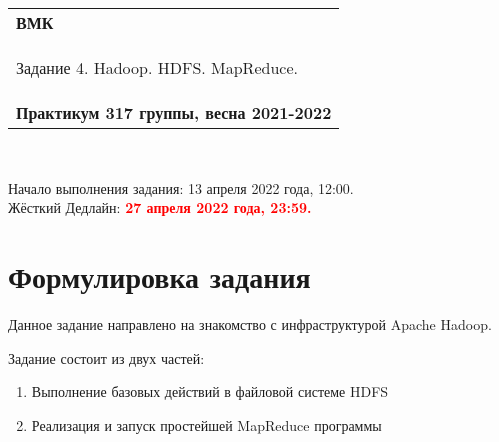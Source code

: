 \documentclass[10pt,fleqn]{article}
\begin{document}
\begin{center}
    \begin{tabular}{|p{17.5cm}|}
        \hline
        \textbf{ВМК}\\
        \begin{center} \Large Задание 4. Hadoop. HDFS. MapReduce. \end{center}\\
        \textbf{Практикум 317 группы, весна 2021-2022}\\
        \hline
    \end{tabular}
\end{center}

\

\begin{tabbing}
    Начало выполнения задания: 13 апреля 2022 года, 12:00.\\
    Жёсткий Дедлайн: \textcolor{red}{\bf 27 апреля 2022 года, 23:59.}
\end{tabbing}


\section*{Формулировка задания}
Данное задание направлено на знакомство с инфраструктурой Apache Hadoop.


Задание состоит из двух частей:
\begin{enumerate}
 \item Выполнение базовых действий в файловой системе HDFS
 \item Реализация и запуск простейшей MapReduce программы
\end{enumerate}
\end{document}
